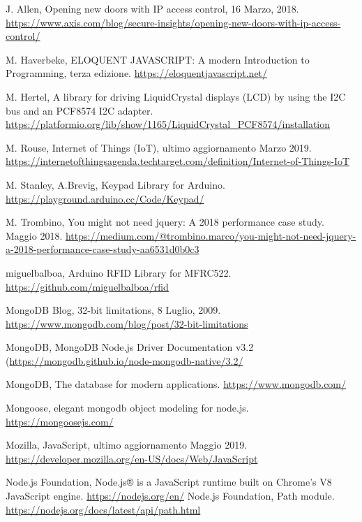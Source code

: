 \documentclass[12pt]{report}
\begin{document}
\begin{thebibliography}{00}
%
J. Allen, Opening new doors with IP access control, 16 Marzo, 2018. \url{https://www.axis.com/blog/secure-insights/opening-new-doors-with-ip-access-control/}
%

%
M. Haverbeke, ELOQUENT JAVASCRIPT: A modern Introduction to Programming, terza edizione.
\url{https://eloquentjavascript.net/}
%

%
M. Hertel, A library for driving LiquidCrystal displays (LCD) by using the I2C bus and an PCF8574 I2C adapter.
\url{https://platformio.org/lib/show/1165/LiquidCrystal_PCF8574/installation}
%

%
M. Rouse, Internet of Things (IoT), ultimo aggiornamento Marzo 2019.
\url{https://internetofthingsagenda.techtarget.com/definition/Internet-of-Things-IoT}
% 

%
M. Stanley, A.Brevig, Keypad Library for Arduino.
\url{https://playground.arduino.cc/Code/Keypad/}
%

%
M. Trombino, You might not need jquery: A 2018 performance
case study. Maggio 2018. 
\url{https://medium.com/@trombino.marco/you-might-not-need-jquery-a-2018-performance-case-study-aa6531d0b0c3}
%

%
miguelbalboa, Arduino RFID Library for MFRC522.
\url{https://github.com/miguelbalboa/rfid}
%

%
MongoDB Blog, 32-bit limitations, 8 Luglio, 2009.
\url{https://www.mongodb.com/blog/post/32-bit-limitations}
%

%
MongoDB, MongoDB Node.js Driver Documentation v3.2
(\url{https://mongodb.github.io/node-mongodb-native/3.2/}
%

%
MongoDB, The database for modern applications.
\url{https://www.mongodb.com/}
%

%
Mongoose, elegant mongodb object modeling for node.js.
\url{https://mongoosejs.com/}
%

%
Mozilla, JavaScript, ultimo aggiornamento Maggio 2019.
\url{https://developer.mozilla.org/en-US/docs/Web/JavaScript}
%

%
Node.js Foundation, Node.js® is a JavaScript runtime built on Chrome's V8 JavaScript engine. \url{https://nodejs.org/en/}
%
Node.js Foundation, Path module.
\url{https://nodejs.org/docs/latest/api/path.html}
%


\end{thebibliography}
\end{document}
